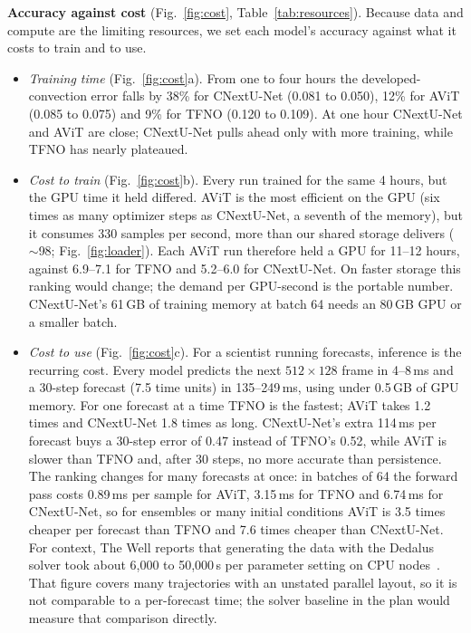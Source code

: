 \documentclass[11pt]{article}
\begin{document}
\textbf{Accuracy against cost} (Fig.~\ref{fig:cost}, Table~\ref{tab:resources}). Because data and compute are
the limiting resources, we set each model's accuracy against what it costs to train and to use.
\begin{itemize}
    \item \emph{Training time} (Fig.~\ref{fig:cost}a). From one to four hours the developed-convection error falls
    by 38\% for CNextU-Net (0.081 to 0.050), 12\% for AViT (0.085 to 0.075) and 9\% for TFNO (0.120 to 0.109). At
    one hour CNextU-Net and AViT are close; CNextU-Net pulls ahead only with more training, while TFNO has nearly
    plateaued.
    \item \emph{Cost to train} (Fig.~\ref{fig:cost}b). Every run trained for the same 4 hours, but the GPU time it
    held differed. AViT is the most efficient on the GPU (six times as many optimizer steps as CNextU-Net, a
    seventh of the memory), but it consumes 330 samples per second, more than our shared storage delivers
    ($\sim$98; Fig.~\ref{fig:loader}). Each AViT run therefore held a GPU for 11--12 hours, against 6.9--7.1 for TFNO
    and 5.2--6.0 for CNextU-Net. On faster storage this ranking would change; the demand per GPU-second is the
    portable number. CNextU-Net's 61\,GB of training memory at batch 64 needs an 80\,GB GPU or a smaller batch.
    \item \emph{Cost to use} (Fig.~\ref{fig:cost}c). For a scientist running forecasts, inference is the recurring
    cost. Every model predicts the next $512\times128$ frame in 4--8\,ms and a 30-step forecast (7.5 time units) in
    135--249\,ms, using under 0.5\,GB of GPU memory. For one forecast at a time TFNO is the fastest; AViT takes 1.2
    times and CNextU-Net 1.8 times as long. CNextU-Net's extra 114\,ms per forecast buys a 30-step error of 0.47
    instead of TFNO's 0.52, while AViT is slower than TFNO and, after 30 steps, no more accurate than persistence.
    The ranking changes for many forecasts at once: in batches of 64 the forward pass costs 0.89\,ms per sample for
    AViT, 3.15\,ms for TFNO and 6.74\,ms for CNextU-Net, so for ensembles or many initial conditions AViT is 3.5
    times cheaper per forecast than TFNO and 7.6 times cheaper than CNextU-Net. For context, The Well
    reports that generating the data with the Dedalus solver took about 6,000 to 50,000\,s per parameter setting
    on CPU nodes~\cite{wellrb}. That figure covers many trajectories with an unstated parallel layout, so it is not
    comparable to a per-forecast time; the solver baseline in the plan would measure that comparison directly.
\end{itemize}
\end{document}
